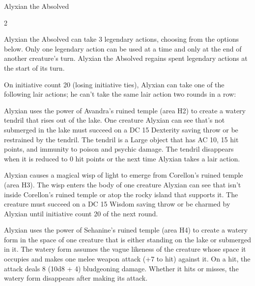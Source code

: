 \documentclass[10pt,a4paper,twoside,bg=none,twocolumn,openany,nodeprecatedcode]{dndbook}
\begin{document}
\begin{DndMonster}[float*=b,width=\textwidth + 8pt]{Alyxian the Absolved}
\begin{multicols}{2}
\par
{}
Alyxian the Absolved can take 3 legendary actions, choosing from the options below. Only one legendary action can be used at a time and only at the end of another creature's turn. Alyxian the Absolved regains spent legendary actions at the start of its turn.

\begin{DndMonsterLegendaryActions}
\end{DndMonsterLegendaryActions}
\par {}
On initiative count 20 (losing initiative ties), Alyxian can take one of the following lair actions; he can't take the same lair action two rounds in a row:


\begin{description}[nolistsep]
\item[Avandra's Grasp]
Alyxian uses the power of Avandra's ruined temple (area H2) to create a watery tendril that rises out of the lake. One creature Alyxian can see that's not submerged in the lake must succeed on a DC 15 Dexterity saving throw or be restrained by the tendril. The tendril is a Large object that has AC 10, 15 hit points, and immunity to poison and psychic damage. The tendril disappears when it is reduced to 0 hit points or the next time Alyxian takes a lair action.

\item[Corellon's Charm]
Alyxian causes a magical wisp of light to emerge from Corellon's ruined temple (area H3). The wisp enters the body of one creature Alyxian can see that isn't inside Corellon's ruined temple or atop the rocky island that supports it. The creature must succeed on a DC 15 Wisdom saving throw or be charmed by Alyxian until initiative count 20 of the next round.

\item[Sehanine's Torment]
Alyxian uses the power of Sehanine's ruined temple (area H4) to create a watery form in the space of one creature that is either standing on the lake or submerged in it. The watery form assumes the vague likeness of the creature whose space it occupies and makes one melee weapon attack (+7 to hit) against it. On a hit, the attack deals 8 (10d8 + 4) bludgeoning damage. Whether it hits or misses, the watery form disappears after making its attack.


\end{description}
\end{multicols}
\end{DndMonster}
\end{document}

